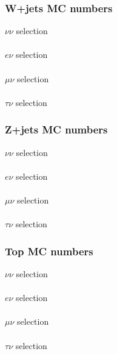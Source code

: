 \documentclass[red,compress,xcolor=table]{beamer}
\begin{document}
\begin{frame}
  \frametitle{W+jets MC numbers}
\vspace*{-0.5cm}
{\tiny
\centering $\nu\nu$ selection\\
\hspace*{-1cm}
\\
\centering $e\nu$ selection\\
\hspace*{-1cm}
\\
\centering $\mu\nu$ selection\\
\hspace*{-1cm}
\\
\centering $\tau\nu$ selection\\
\hspace*{-1cm}

}
\end{frame}

\begin{frame}
  \frametitle{Z+jets MC numbers}
\vspace*{-0.5cm}
{\tiny
\centering $\nu\nu$ selection\\
\\
\centering $e\nu$ selection\\
\\
\centering $\mu\nu$ selection\\
\\
\centering $\tau\nu$ selection\\

}
\end{frame}

\begin{frame}
  \frametitle{Top MC numbers}
\vspace*{-0.5cm}
{\tiny
\centering $\nu\nu$ selection\\
\\
\centering $e\nu$ selection\\
\\
\centering $\mu\nu$ selection\\
\\
\centering $\tau\nu$ selection\\

}
\end{frame}
\end{document}
